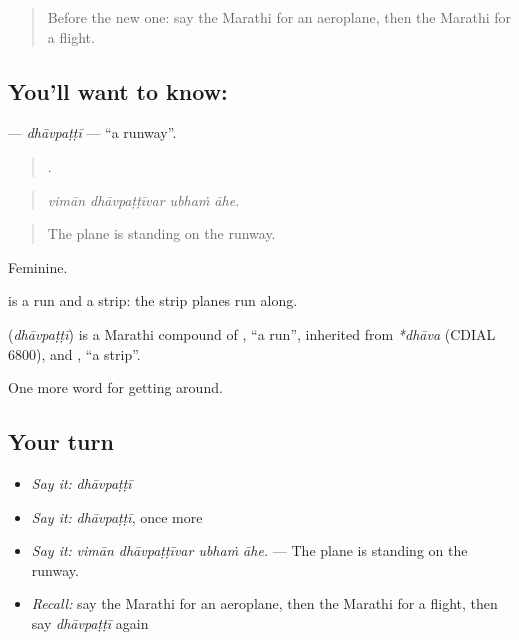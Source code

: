\label{lesson:MR-C405-dhavpatti}



\begin{quote}
Before the new one: say the Marathi for an aeroplane, then the Marathi for a flight.
\end{quote}

\subsection*{You'll want to know: }
\textbf{} — \emph{dhāvpaṭṭī} — \textquotedblleft{}a runway\textquotedblright{}.

\begin{quote}
   .
\end{quote}

\begin{quote}
\emph{vimān dhāvpaṭṭīvar ubhaṁ āhe.}
\end{quote}

\begin{quote}
The plane is standing on the runway.
\end{quote}

Feminine.

 is a run and  a strip: the strip planes run along.

\begin{cousinweb}
\textbf{} (\emph{dhāvpaṭṭī}) is a Marathi compound of \textbf{}, \textquotedblleft{}a run\textquotedblright{}, inherited from \emph{*dhāva} (CDIAL 6800), and \textbf{}, \textquotedblleft{}a strip\textquotedblright{}.
\end{cousinweb}

\begin{grammarlens}[title={What you've built}]
One more word for getting around.
\end{grammarlens}

\subsection*{Your turn}
\begin{itemize}
\raggedright
  \item \emph{Say it:} \emph{dhāvpaṭṭī}
  \item \emph{Say it:} \emph{dhāvpaṭṭī}, once more
  \item \emph{Say it:} \emph{vimān dhāvpaṭṭīvar ubhaṁ āhe.} — The plane is standing on the runway.
  \item \emph{Recall:} say the Marathi for an aeroplane, then the Marathi for a flight, then say \emph{dhāvpaṭṭī} again
\end{itemize}

